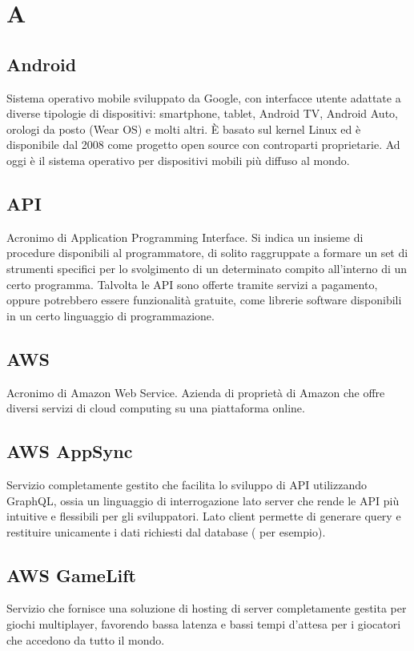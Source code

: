 \section*{A}
\markright{}
\subsection*{Android}
Sistema operativo mobile sviluppato da Google, con interfacce utente adattate a diverse tipologie di dispositivi: smartphone, tablet, Android TV, Android Auto, orologi da posto (Wear OS) e molti altri. È basato sul kernel Linux ed è disponibile dal 2008 come progetto open source con controparti proprietarie. Ad oggi è il sistema operativo per dispositivi mobili più diffuso al mondo.
\subsection*{API}
Acronimo di Application Programming Interface. Si indica un  insieme  di  procedure disponibili al programmatore, di solito  raggruppate a formare un set di strumenti specifici per lo svolgimento di un determinato compito all’interno di un certo programma. Talvolta le API sono offerte tramite servizi a pagamento, oppure potrebbero essere funzionalità gratuite, come librerie software disponibili in un certo linguaggio di programmazione.
\subsection*{AWS}
Acronimo di Amazon Web Service. Azienda di proprietà di Amazon che offre diversi servizi di cloud computing su una piattaforma online.
\subsection*{AWS AppSync}
Servizio  completamente gestito che facilita lo sviluppo di API utilizzando GraphQL, ossia un linguaggio di interrogazione lato server che rende le API più intuitive e flessibili per gli sviluppatori. Lato client permette di generare query e restituire unicamente i dati richiesti dal database ( per esempio).  
\subsection*{AWS GameLift}
Servizio  che fornisce una soluzione di hosting di server completamente gestita per giochi multiplayer, favorendo bassa latenza e bassi tempi d'attesa per i giocatori che accedono da tutto il mondo.  

